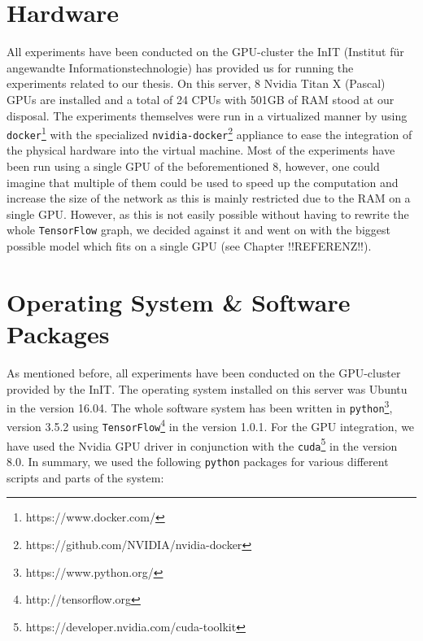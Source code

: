 \section{Hardware}
\label{software_system:hardware}
All experiments have been conducted on the GPU-cluster the InIT (Institut für angewandte Informationstechnologie) has provided us for running the experiments related to our thesis. On this server, 8 Nvidia Titan X (Pascal) GPUs are installed and a total of 24 CPUs with 501GB of RAM stood at our disposal. The experiments themselves were run in a virtualized manner by using \texttt{docker}\footnote{https://www.docker.com/} with the specialized \texttt{nvidia-docker}\footnote{https://github.com/NVIDIA/nvidia-docker} appliance to ease the integration of the physical hardware into the virtual machine. Most of the experiments have been run using a single GPU of the beforementioned 8, however, one could imagine that multiple of them could be used to speed up the computation and increase the size of the network as this is mainly restricted due to the RAM on a single GPU. However, as this is not easily possible without having to rewrite the whole \texttt{TensorFlow} graph, we decided against it and went on with the biggest possible model which fits on a single GPU (see Chapter !!REFERENZ!!).

\section{Operating System \& Software Packages}
\label{software_system:software_packages}
As mentioned before, all experiments have been conducted on the GPU-cluster provided by the InIT. The operating system installed on this server was Ubuntu in the version 16.04. The whole software system has been written in \texttt{python}\footnote{https://www.python.org/}, version 3.5.2 using \texttt{TensorFlow}\footnote{http://tensorflow.org} in the version 1.0.1. For the GPU integration, we have used the Nvidia GPU driver in conjunction with the \texttt{cuda}\footnote{https://developer.nvidia.com/cuda-toolkit} in the version 8.0. In summary, we used the following \texttt{python} packages for various different scripts and parts of the system:

